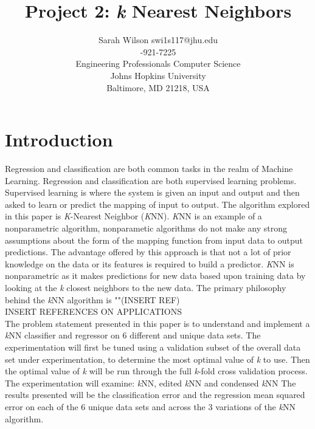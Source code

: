 \documentclass[twoside,11pt]{article}
\begin{document}
\title{Project 2: \textit{k} Nearest Neighbors}

\author{\name Sarah Wilson 
	   \email swi1s117@jhu.edu \\
	   -921-7225 \\
       \addr Engineering Professionals Computer Science\\
       Johns Hopkins University\\
       Baltimore, MD 21218, USA} 

\maketitle


\section{Introduction}
Regression and classification are both common tasks in the realm of Machine Learning. Regression and classification are both supervised learning problems. Supervised learning is where the system is given an input and output and then asked to learn or predict the mapping of input to output. The algorithm explored in this paper is \textit{K}-Nearest Neighbor (\textit{K}NN). \textit{K}NN is an example of a nonparametric algorithm, nonparametic algorithms do not make any strong assumptions about the form of the mapping function from input data to output predictions. The advantage offered by this approach is that not a lot of prior knowledge on the data or its features is required to build a predictor. \textit{K}NN is nonparametric as it makes predictions for new data based upon training data by looking at the \textit{k} closest neighbors to the new data. The primary philosophy behind the \textit{k}NN algorithm is ""(INSERT REF)\\ 

\hspace*{10mm} INSERT REFERENCES ON APPLICATIONS\\

\hspace*{10mm} The problem statement presented in this paper is to understand and implement a \textit{k}NN classifier and regressor on 6 different and unique data sets. The experimentation will first be tuned using a validation subset of the overall data set under experimentation, to determine the most optimal value of \textit{k} to use. Then the optimal value of \textit{k} will be run through the full \textit{k}-fold cross validation process. The experimentation will examine: \textit{k}NN, edited \textit{k}NN and condensed \textit{k}NN The results presented will be the classification error and the regression mean squared error on each of the 6 unique data sets and across the 3 variations of the  \textit{k}NN algorithm.\\
\end{document}

